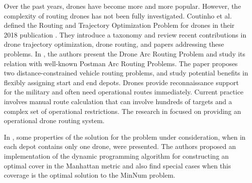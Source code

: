 \documentclass[runningheads]{llncs}
\begin{document}
Over the past years, drones have become more and more popular. However, the complexity of routing drones has not been fully investigated. Coutinho et al. defined the Routing and Trajectory Optimization Problem for drones in their 2018 publication \cite{Coutinho:18}. They introduce a taxonomy and review recent contributions in drone trajectory optimization, drone routing, and papers addressing these problems. In \cite{Campbell:18}, the authors present the Drone Arc Routing Problem and study its relation with well-known Postman Arc Routing Problems. The paper \cite{Kek:08} proposes two distance-constrained vehicle routing problems, and study potential benefits in flexibly assigning start and end depots. Drones provide reconnaissance support for the military and often need operational routes immediately. Current practice involves manual route calculation that can involve hundreds of targets and a complex set of operational restrictions. The research in \cite{Kinney:17} focused on providing an operational drone routing system.

In \cite{ErPlot20}, some properties of the solution for the problem under consideration, when in each depot contains only one drone, were presented. The authors proposed an implementation of the dynamic programming algorithm for constructing an optimal cover in the Manhattan metric and also find special cases when this coverage is the optimal solution to the MinNum problem.
\end{document}

